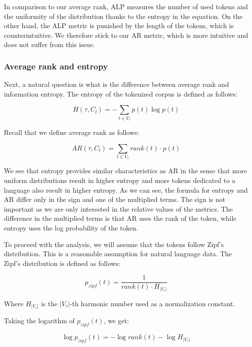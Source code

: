 In comparison to our average rank, ALP measures the number of used tokens and the uniformity of the distribution thanks to the entropy in the equation. On the other hand, the ALP metric is punished by the length of the tokens, which is counterintuitive. We therefore stick to our AR metric, which is more intuitive and does not suffer from this issue.


\subsubsection{Average rank and entropy}

Next, a natural question is what is the difference between average rank and information entropy. The entropy of the tokenized corpus is defined as follows:

\begin{equation}
    H(\tau, C_l) = - \sum_{t \in V_\tau} p(t) \log p(t)
\end{equation}

Recall that we define average rank as follows:

\begin{equation}
    AR(\tau, C_l) = \sum_{t \in V_\tau} rank(t) \cdot p(t)
\end{equation}

We see that entropy provides similar characteristics as AR in the sense that more uniform distributions result in higher entropy and more tokens dedicated to a language also result in higher entropy. As we can see, the formula for entropy and AR differ only in the sign and one of the multiplied terms. The sign is not important as we are only interested in the relative values of the metrics. The difference in the multiplied terms is that AR uses the rank of the token, while entropy uses the log probability of the token. 

To proceed with the analysis, we will assume that the tokens follow Zipf's distribution. This is a reasonable assumption for natural language data. The Zipf's distribution is defined as follows:

\begin{equation}
    p_{zipf}(t) = \frac{1}{rank(t) \cdot H_{|V_\tau|}}
\end{equation}

Where $H_{|V_\tau|}$ is the $|V_\tau|$-th harmonic number used as a normalization constant.

Taking the logarithm of $p_{zipf}(t)$, we get:

\begin{equation}
    \log p_{zipf}(t) = - \log rank(t) - \log H_{|V_\tau|}
\end{equation}

